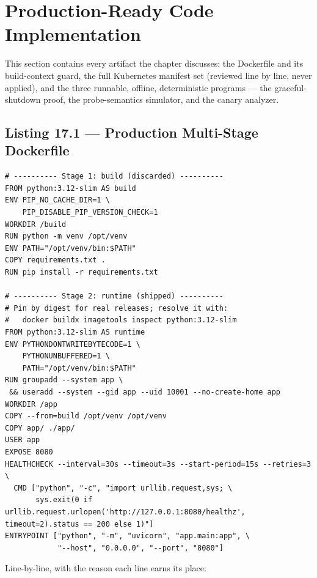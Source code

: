 \section{Production-Ready Code Implementation}
\label{sec:ch17-code}

This section contains every artifact the chapter discusses: the
Dockerfile and its build-context guard, the full Kubernetes manifest set
(reviewed line by line, never applied), and the three runnable,
offline, deterministic programs --- the graceful-shutdown proof, the
probe-semantics simulator, and the canary analyzer.

\subsection{Listing 17.1 --- Production Multi-Stage Dockerfile}
\label{sec:ch17-dockerfile}
\label{lst:ch17-dockerfile}

\begin{verbatim}
# ---------- Stage 1: build (discarded) ----------
FROM python:3.12-slim AS build
ENV PIP_NO_CACHE_DIR=1 \
    PIP_DISABLE_PIP_VERSION_CHECK=1
WORKDIR /build
RUN python -m venv /opt/venv
ENV PATH="/opt/venv/bin:$PATH"
COPY requirements.txt .
RUN pip install -r requirements.txt

# ---------- Stage 2: runtime (shipped) ----------
# Pin by digest for real releases; resolve it with:
#   docker buildx imagetools inspect python:3.12-slim
FROM python:3.12-slim AS runtime
ENV PYTHONDONTWRITEBYTECODE=1 \
    PYTHONUNBUFFERED=1 \
    PATH="/opt/venv/bin:$PATH"
RUN groupadd --system app \
 && useradd --system --gid app --uid 10001 --no-create-home app
WORKDIR /app
COPY --from=build /opt/venv /opt/venv
COPY app/ ./app/
USER app
EXPOSE 8080
HEALTHCHECK --interval=30s --timeout=3s --start-period=15s --retries=3 \
  CMD ["python", "-c", "import urllib.request,sys; \
       sys.exit(0 if urllib.request.urlopen('http://127.0.0.1:8080/healthz', timeout=2).status == 200 else 1)"]
ENTRYPOINT ["python", "-m", "uvicorn", "app.main:app", \
            "--host", "0.0.0.0", "--port", "8080"]
\end{verbatim}

Line-by-line, with the reason each line earns its place:

